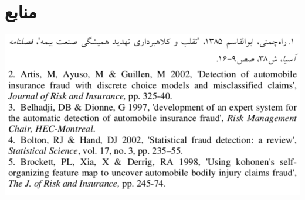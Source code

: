 \documentclass[paper=a4, fontsize=11pt]{article}
\numberwithin{equation}{section} %
\numberwithin{figure}{section} %
\numberwithin{table}{section} %
\begin{document}
\newpage
\section{منابع}
\includegraphics[scale=1]{resources}
\end{document}

